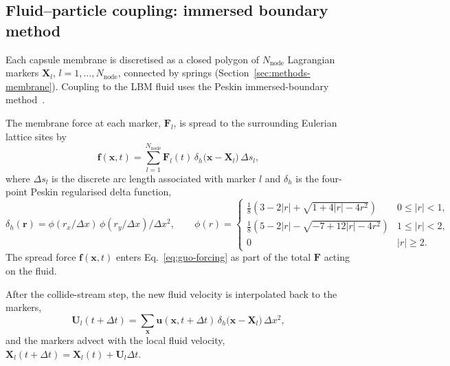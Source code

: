 \documentclass[11pt,a4paper]{article}
\begin{document}
\subsection{Fluid--particle coupling: immersed boundary method}
\label{sec:methods-ibm}

Each capsule membrane is discretised as a closed polygon of
$N_{\text{node}}$ Lagrangian markers $\boldsymbol X_l$, $l = 1,\dots,N_{\text{node}}$,
connected by springs (Section~\ref{sec:methods-membrane}).
Coupling to the LBM fluid uses the Peskin immersed-boundary
method~\citep{peskin2002immersed}.

The membrane force at each marker, $\boldsymbol F_l$, is spread to
the surrounding Eulerian lattice sites by
\begin{equation}
\boldsymbol f(\boldsymbol x, t) =
\sum_{l=1}^{N_{\text{node}}}
   \boldsymbol F_l(t)\,
   \delta_h\bigl(\boldsymbol x - \boldsymbol X_l\bigr)\,
   \Delta s_l,
\label{eq:spreading}
\end{equation}
where $\Delta s_l$ is the discrete arc length associated with marker
$l$ and $\delta_h$ is the four-point Peskin regularised delta
function,
\begin{equation}
\delta_h(\boldsymbol r) = \phi(r_x/\Delta x)\,\phi(r_y/\Delta x)/\Delta x^2,
\qquad
\phi(r) =
\begin{cases}
\tfrac{1}{8}\!\left(3 - 2|r| + \sqrt{1 + 4|r| - 4 r^2}\right)
  & 0 \le |r| < 1,\\
\tfrac{1}{8}\!\left(5 - 2|r| - \sqrt{-7 + 12|r| - 4 r^2}\right)
  & 1 \le |r| < 2,\\
0 & |r| \ge 2.
\end{cases}
\label{eq:peskin}
\end{equation}
The spread force $\boldsymbol f(\boldsymbol x, t)$ enters
Eq.~\eqref{eq:guo-forcing} as part of the total $\boldsymbol F$
acting on the fluid.

After the collide-stream step, the new fluid velocity is
interpolated back to the markers,
\begin{equation}
\boldsymbol U_l(t + \Delta t) =
\sum_{\boldsymbol x}
   \boldsymbol u(\boldsymbol x, t + \Delta t)\,
   \delta_h\bigl(\boldsymbol x - \boldsymbol X_l\bigr)\,
   \Delta x^2,
\label{eq:interp}
\end{equation}
and the markers advect with the local fluid velocity,
$\boldsymbol X_l(t + \Delta t) = \boldsymbol X_l(t) +
\boldsymbol U_l \Delta t$.
\end{document}

